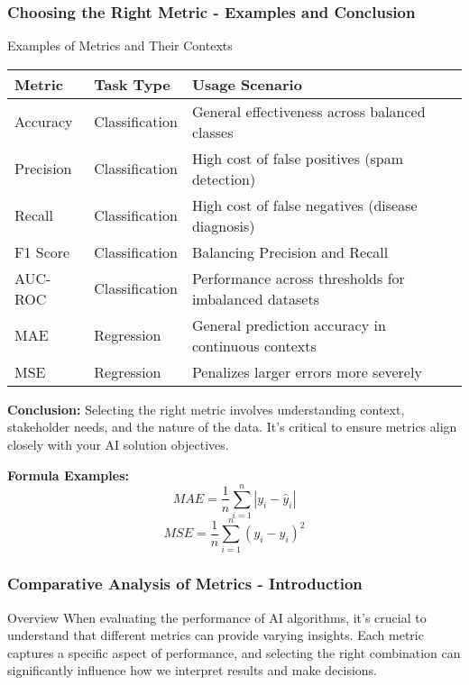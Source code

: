 \documentclass[aspectratio=169]{beamer}
\begin{document}
\begin{frame}[fragile]
    \frametitle{Choosing the Right Metric - Examples and Conclusion}
    \begin{block}{Examples of Metrics and Their Contexts}
        \begin{tabular}{|l|l|l|}
            \hline
            \textbf{Metric} & \textbf{Task Type} & \textbf{Usage Scenario} \\
            \hline
            Accuracy & Classification & General effectiveness across balanced classes \\
            Precision & Classification & High cost of false positives (spam detection) \\
            Recall & Classification & High cost of false negatives (disease diagnosis) \\
            F1 Score & Classification & Balancing Precision and Recall \\
            AUC-ROC & Classification & Performance across thresholds for imbalanced datasets \\
            MAE & Regression & General prediction accuracy in continuous contexts \\
            MSE & Regression & Penalizes larger errors more severely \\
            \hline
        \end{tabular}
    \end{block}
    
    \textbf{Conclusion:} Selecting the right metric involves understanding context, stakeholder needs, and the nature of the data. It's critical to ensure metrics align closely with your AI solution objectives.

    \textbf{Formula Examples:}
    \begin{equation}
        MAE = \frac{1}{n} \sum_{i=1}^{n} |y_i - \hat{y}_i|
    \end{equation}
    \begin{equation}
        MSE = \frac{1}{n} \sum_{i=1}^{n} (y_i - \hat{y}_i)^2
    \end{equation}
\end{frame}

\begin{frame}[fragile]
    \frametitle{Comparative Analysis of Metrics - Introduction}
    \begin{block}{Overview}
        When evaluating the performance of AI algorithms, it's crucial to understand that different metrics can provide varying insights. Each metric captures a specific aspect of performance, and selecting the right combination can significantly influence how we interpret results and make decisions.
    \end{block}
\end{frame}
\end{document}
